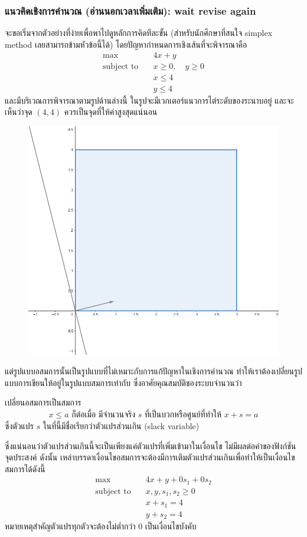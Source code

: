 \subsubsection*{แนวคิดเชิงการคำนวณ (อ่านนอกเวลาเพิ่มเติม): wait revise again}
จะขอเริ่มจากตัวอย่างที่ง่ายเพื่อพาไปดูหลักการคิดทีละขั้น (สำหรับนักศึกษาที่สนใจ simplex method เลยสามารถข้ามหัวข้อนี้ได้) โดยปัญหากำหนดการเชิงเส้นที่จะพิจารณาคือ
\begin{align*}
    \max  &\quad 4x + y \\
    \text{subject to} &\quad x\geq0, \quad y\geq0\\
                &\quad x\leq 4\\
                &\quad y\leq 4
\end{align*}
และมีบริเวณการพิจารณาตามรูปด้านล่างนี้ ในรูปจะมีเวกเตอร์แนวการไต่ระดับของระนาบอยู่ และจะเห็นว่าจุด $(4,4)$ ควรเป็นจุดที่ให้ค่าสูงสุดแน่นอน
\begin{figure}[h]
    \centering
    \includegraphics[width=0.4\linewidth]{basicSimplex1.png}
\end{figure}

แต่รูปแบบอสมการนั้นเป็นรูปแบบที่ไม่เหมาะกับการแก้ปัญหาในเชิงการคำนวณ ทำให้เราต้องเปลี่ยนรูปแบบการเขียนให้อยู่ในรูปแบบสมการเท่ากับ ซึ่งอาศัยคุณสมบัติของระบบจำนวนว่า
\begin{property}
    {เปลี่ยนอสมการเป็นสมการ}{}
    $$
    x \leq a \text{ ก็ต่อเมื่อ มีจำนวนจริง } s \text{ ที่เป็นบวกหรือศูนย์ที่ทำให้ } x+s = a
    $$
    ซึ่งตัวแปร $s$ ในที่นี้มีชื่อเรียกว่าตัวแปรส่วนเกิน (slack variable)
\end{property}

ซึ่งแน่นอนว่าตัวแปรส่วนเกินนี้จะเป็นเพียงแค่ตัวแปรที่เพิ่มเข้ามาในเงื่อนไข ไม่มีผลต่อค่าของฟังก์ชันจุดประสงค์ ดังนั้น เหล่าบรรดาเงื่อนไขอสมการจะต้องมีการเติมตัวแปรส่วนเกินเพื่อทำให้เป็นเงื่อนไขสมการได้ดังนี้
\begin{align*}
    \max  &\quad 4x + y + 0s_1 + 0s_2 \\
    \text{subject to} &\quad x, y, s_1, s_2\geq0\\
                &\quad x + s_1 = 4\\
                &\quad y + s_2 = 4
\end{align*}
หมายเหตุสำคัญตัวแปรทุกตัวจะต้องไม่ต่ำกว่า 0 เป็นเงื่อนไขบังคับ

